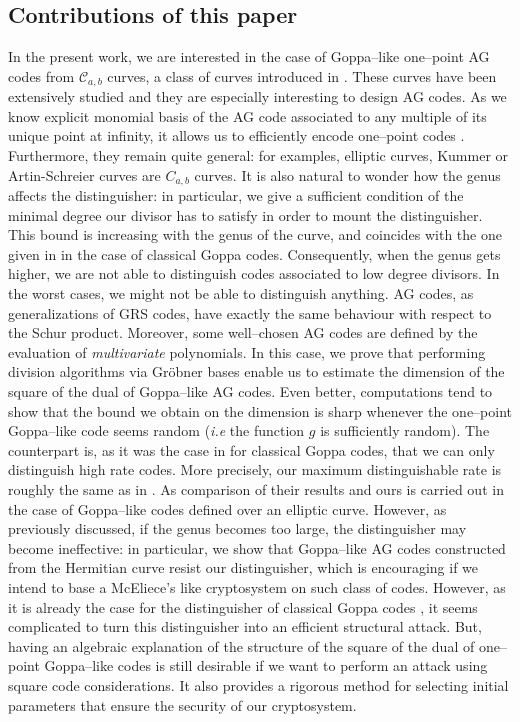 \documentclass[a4paper]{amsart}
\theoremstyle{definition}
\theoremstyle{remark}
\newcommand{\calC}{\mathcal{C}}
\begin{document}
\subsection*{Contributions of this paper}
In the present work, we are interested in the case of Goppa--like one--point AG codes from $\calC_{a,b}$ curves, a class of curves introduced in \cite{Miu93}. These curves have been extensively studied and they are especially interesting to design AG codes. As we know explicit monomial basis of the AG code associated to any multiple of its unique point at infinity, it allows us to efficiently encode one--point codes \cite{BRS21}. Furthermore, they remain quite general: for examples, elliptic curves, Kummer or Artin-Schreier curves are $C_{a,b}$ curves. It is also natural to wonder how the genus affects the distinguisher: in particular, we give a sufficient condition of the minimal degree our divisor has to satisfy in order to mount the distinguisher. This bound is increasing with the genus of the curve, and coincides with the one given in \cite{MT21} in the case of classical Goppa codes. Consequently, when the genus gets higher, we are not able to distinguish codes associated to low degree divisors. In the worst cases, we might not be able to distinguish anything.
AG codes, as generalizations of GRS codes, have exactly the same behaviour with respect to the Schur product. Moreover, some well--chosen AG codes are defined by the evaluation of \textit{multivariate} polynomials. In this case, we prove that performing division algorithms via Gr\"obner bases enable us to estimate the dimension of the square of the dual of Goppa--like AG codes. Even better, computations tend to show that the bound we obtain on the dimension is sharp whenever the one--point Goppa--like code seems random (\emph{i.e} the function $g$ is sufficiently random). The counterpart is, as it was the case in \cite{MT21} for classical Goppa codes, that we can only distinguish high rate codes. More precisely, our maximum distinguishable rate is roughly the same as in \cite{MT21}. As comparison of their results and ours is carried out in the case of Goppa--like codes defined over an elliptic curve. However, as previously discussed, if the genus becomes too large, the distinguisher may become ineffective: in particular, we show that Goppa--like AG codes constructed from the Hermitian curve resist our distinguisher, which is encouraging if we intend to base a McEliece's like cryptosystem on such class of codes.
However, as it is already the case for the distinguisher of classical Goppa codes \cite{MT21}, it seems complicated to turn this distinguisher into an efficient structural attack. But, having an algebraic explanation of the structure of the square of the dual of one--point Goppa--like codes is still desirable if we want to perform an attack using square code considerations. It also provides a rigorous method for selecting initial parameters that ensure the security of our cryptosystem.
\end{document}
